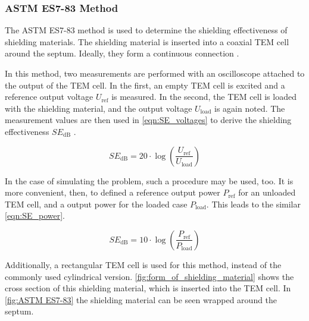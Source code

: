 \subsubsection{ASTM ES7-83 Method}

The ASTM ES7-83 method is used to determine the shielding effectiveness of shielding materials. The shielding material is inserted into a coaxial TEM cell around the septum. Ideally, they form a continuous connection \cite{MORARI_BĂLAN_2015}. 

In this method, two measurements are performed with an oscilloscope attached to the output of the TEM cell. In the first, an empty TEM cell is excited and a reference output voltage $U_\mathrm{ref}$ is measured. In the second, the TEM cell is loaded with the shielding material, and the output voltage $U_\mathrm{load}$ is again noted. The measurement values are then used in \autoref{eqn:SE_voltages} to derive the shielding effectiveness $SE_\mathrm{dB}$ \cite{MORARI_BĂLAN_2015}.

\begin{equation}
    SE_\mathrm{dB}=20\cdot\log{\left(\frac{U_\mathrm{ref}}{U_\mathrm{load}}\right)}
    \label{eqn:SE_voltages}
\end{equation}

In the case of simulating the problem, such a procedure may be used, too. It is more convenient, then, to defined a reference output power $P_\mathrm{ref}$ for an unloaded TEM cell, and a output power for the loaded case $P_\mathrm{load}$. This leads to the similar \autoref{eqn:SE_power}.

\begin{equation}
    SE_\mathrm{dB}=10\cdot\log{\left( \frac{P_\mathrm{ref}}{P_\mathrm{load}} \right)}
    \label{eqn:SE_power}
\end{equation}

Additionally, a rectangular TEM cell is used for this method, instead of the commonly used cylindrical version. \autoref{fig:form_of_shielding_material} shows the cross section of this shielding material, which is inserted into the TEM cell. In \autoref{fig:ASTM ES7-83} the shielding material can be seen wrapped around the septum. 

